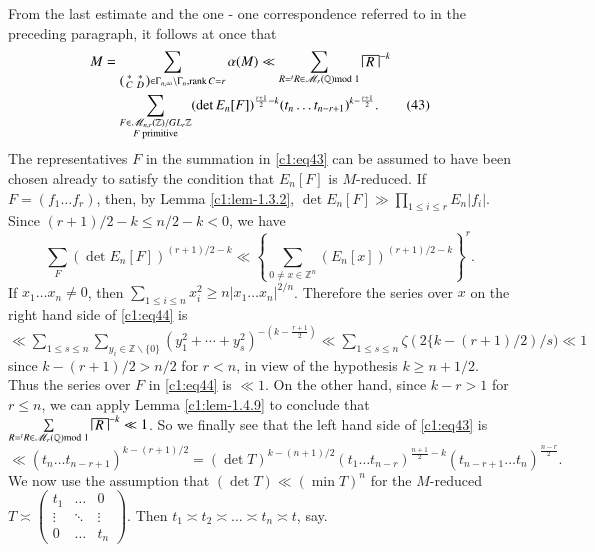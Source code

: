 From the last estimate and the one - one correspondence referred to in
the preceding paragraph, it follows at once that 
\begin{align*}
M &= \sum_{
\left(
\begin{smallmatrix}
\ast & \ast\\
C & D
\end{smallmatrix}\right)\in \Gamma_{n,\infty}\backslash \Gamma_{n},\rank C=r}\alpha(M)
\ll \sum_{R={}^{t}R\in\mathscr{M}_{r}(\mathbb{Q})\rm{mod} \;
  1}{\house{R}}^{-k}\\
&\quad \sum_{\substack{F\in\mathscr{M}_{n,r}(\mathbb{Z})/GL_{r}\mathbb{Z}\\ F
    \text{ primitive}}}(\det E_{n}[F])^{\frac{r+1}{2}-k}(t_{n}\ldots
  t_{n-r+1})^{k-\frac{r+1}{2}}.\tag{43}\label{c1:eq43}
\end{align*}
The representatives $F$ in the summation in \eqref{c1:eq43} can be
assumed to have been chosen already to satisfy the condition that
$E_{n}[F]$ is $M$-reduced. If $F=(f_{1}\ldots f_{r})$, then, by Lemma
\ref{c1:lem-1.3.2}, $\det E_{n}[F]\gg \prod\limits_{1\leq i\leq
  r}E_{n}|f_{i}|$. Since $(r+1)/2-k\leq n/2-k<0$, we have
\begin{equation*}
\sum_{F}(\det E_{n}[F])^{(r+1)/2-k}\ll \left\{\sum_{0\neq
  x\in\mathbb{Z}^{n}}(E_{n}[x])^{(r+1)/2-k}\right\}^{r}.\tag{44}\label{c1:eq44} 
\end{equation*}
If $x_{1}\ldots x_{n}\neq 0$, then $\sum\limits_{1\leq i\leq
  n}x^{2}_{i}\geq n|x_{1}\ldots x_{n}|^{2/n}$. Therefore the series
over $x$ on the right hand side of \eqref{c1:eq44} is $\ll \sum_{1\leq
  s\leq n}\sum\limits_{y_{i}\in\mathbb{Z}\backslash
  \{0\}}(y^{2}_{1}+\cdots+y^{2}_{s})^{-(k-\frac{r+1}{2})}\ll
\sum\limits_{1\leq s\leq n}\zeta(2\{k-(r+1)/2)/s)\ll 1$\pageoriginale
since $k-(r+1)/2>n/2$ for $r<n$, in view of the hypothesis $k\geq
n+1/2$. Thus the series over $F$ in \eqref{c1:eq44} is $\ll 1$. On the
other hand, since $k-r>1$ for $r\leq n$, we can apply Lemma
\ref{c1:lem-1.4.9} to conclude that $\sum\limits_{R={}^{t}R\in
  \mathscr{M}_{r}(\mathbb{Q})\rm{mod} \; 1}{\house{R}}^{-k}\ll 1$. So
we finally see that the left hand side of \eqref{c1:eq43} is
{\fontsize{10}{12}\selectfont
$$
\ll (t_{n}\ldots t_{n-r+1})^{k-(r+1)/2}=(\det
T)^{k-(n+1)/2}(t_{1}\ldots t_{n-r})^{\frac{n+1}{2}-k}(t_{n-r+1}\ldots t_{n})^{\frac{n-r}{2}}.
$$}\relax  
We now use the assumption that $(\det T)\ll (\min T)^{n}$ for the
$M$-reduced $T\asymp \left(\begin{smallmatrix} t_{1} & \ldots &
  0\\ \vdots & \ddots & \vdots\\ 0 & \ldots & t_{n}
\end{smallmatrix}\right)$. Then $t_{1}\asymp t_{2}\asymp \ldots \asymp
t_{n}\asymp t$, say. 

